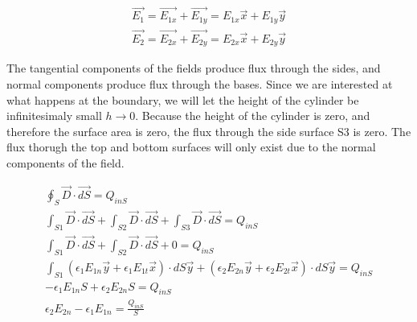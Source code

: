 \documentclass{ximera}
\begin{document}
\begin{eqnarray}
\vec{E_1}= \vec{E_{1x}}+\vec{E_{1y}}= E_{1x} \vec{x}+E_{1y} \vec{y} \\
\vec{E_2}= \vec{E_{2x}}+\vec{E_{2y}}= E_{2x} \vec{x}+E_{2y} \vec{y}
\end{eqnarray}


The tangential components of the fields produce flux through the sides, and normal components produce flux through the bases.  Since we are interested at what happens at the boundary, we will let the height of the cylinder be infinitesimaly small $h \rightarrow 0$. Because the height of the cylinder is zero, and therefore the surface area is zero, the flux through the side surface S3 is zero. The flux thorugh the top and bottom surfaces will only exist due to the normal components of the field.

\begin{eqnarray}
\oint_S \vec{D} \cdot \vec{dS} = Q_{inS} \\
\int_{S1} \vec{D} \cdot \vec{dS}  +\int_{S2} \vec{D} \cdot \vec{dS}+\int_{S3} \vec{D} \cdot \vec{dS}  =  Q_{inS} \\
\int_{S1} \vec{D} \cdot \vec{dS}  +\int_{S2} \vec{D} \cdot \vec{dS} +0 = Q_{inS} \\
\int_{S1} (\epsilon_1 E_{1n}\vec{y}+\epsilon_1 E_{1t}\vec{x}) \cdot dS\vec{y}  +(\epsilon_2 E_{2n}\vec{y}+\epsilon_2 E_{2t}\vec{x}) \cdot dS\vec{y} = Q_{inS}\\
-\epsilon_{1} E_{1n} S + \epsilon_2 E_{2n} S = Q_{inS}  \\
\epsilon_2 E_{2n} -\epsilon_{1} E_{1n}= \frac{Q_{inS}}{S} 
\end{eqnarray}
\end{document}

